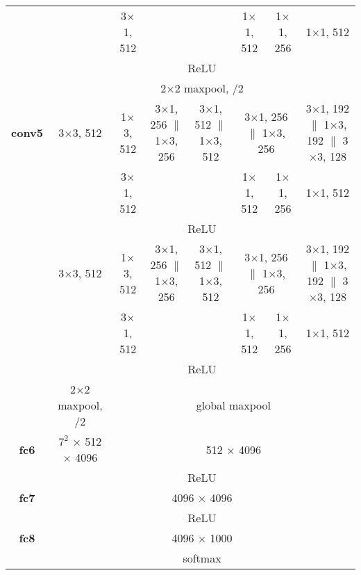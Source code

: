 \documentclass[thesis]{subfiles}
\begin{document}
{\begin{landscape}
\begin{table*}[p]
\begin{tabular}{@{}|c||c|c|c|c|c|c|c|c|@{}}
        \cline{4-4} \cline{7-9}
        & \multicolumn{2}{c|}{} & 3$\times$1, 512 & & & 1$\times$1, 512 & 1$\times$1, 256 & 1$\times$1, 512\\
        \cline{2-9}
        & \multicolumn{8}{c|}{ReLU}\\
        \cline{2-9}
        & \multicolumn{8}{c|}{2$\times$2 maxpool, /2}\\
        \hline
        \textbf{conv5} & \multicolumn{2}{c|}{3$\times$3, 512} & 1$\times$3, 512 & 3$\times$1, 256 $\|$ 1$\times$3, 256 & 3$\times$1, 512 $\|$ 1$\times$3, 512 & \multicolumn{2}{c|}{3$\times$1, 256 $\|$ 1$\times$3, 256} & 3$\times$1, 192 $\|$ 1$\times$3, 192 $\|$ 3$\times$3, 128\\
        \cline{4-4} \cline{7-9}
        & \multicolumn{2}{c|}{} & 3$\times$1, 512 & & & 1$\times$1, 512 & 1$\times$1, 256 & 1$\times$1, 512\\
        \cline{2-9}
        & \multicolumn{8}{c|}{ReLU}\\
        \cline{2-9}
        & \multicolumn{2}{c|}{3$\times$3, 512} & 1$\times$3, 512 & 3$\times$1, 256 $\|$ 1$\times$3, 256 & 3$\times$1, 512 $\|$ 1$\times$3, 512 & \multicolumn{2}{c|}{3$\times$1, 256 $\|$ 1$\times$3, 256} & 3$\times$1, 192 $\|$ 1$\times$3, 192 $\|$ 3$\times$3, 128\\
        \cline{4-4} \cline{7-9}
        & \multicolumn{2}{c|}{} & 3$\times$1, 512 & & & 1$\times$1, 512 & 1$\times$1, 256 & 1$\times$1, 512\\
        \cline{2-9}
        & \multicolumn{8}{c|}{ReLU}\\
        \cline{2-9}
        & 2$\times$2 maxpool, /2 & \multicolumn{7}{c|}{global maxpool}\\
        \hline
        \textbf{fc6} & $7^2$ $\times$ 512 $\times$ 4096 & \multicolumn{7}{c|}{512 $\times$ 4096}\\
        \cline{2-9}
        & \multicolumn{8}{c|}{ReLU}\\
        \hline
        \textbf{fc7} & \multicolumn{8}{c|}{4096 $\times$ 4096}\\
        \cline{2-9}
        & \multicolumn{8}{c|}{ReLU}\\
        \hline
        \textbf{fc8} & \multicolumn{8}{c|}{4096 $\times$ 1000}\\
        \cline{2-9}
        & \multicolumn{8}{c|}{softmax}\\
        \hline
    \end{tabular}
    \label{table:vggarch}
    \end{table*}
    \end{landscape}}
\end{document}
